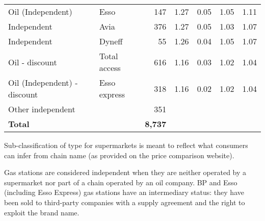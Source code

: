 \documentclass[english]{article}
\begin{document}
\begin{table}[H]
\begin{threeparttable}
\begin{tabular}{llrrrrr}
    Oil (Independent) & Esso  & 147   & 1.27  & 0.05  & 1.05  & 1.11 \\
    Independent & Avia  & 376   & 1.27  & 0.05  & 1.03  & 1.07 \\
    Independent & Dyneff & 55    & 1.26  & 0.04  & 1.05  & 1.07 \\
    Oil - discount & Total access & 616   & 1.16  & 0.03  & 1.02  & 1.04 \\
    Oil (Independent) - discount & Esso express & 318   & 1.16  & 0.02  & 1.02  & 1.04 \\
    Other independent &       & 351   &       &       &       &  \\
		\hline
    \textbf{Total} &       & \textbf{8,737} &       &       &       &  \\
    \hline
		\hline
\end{tabular}
\begin{tablenotes}
			\small
			\item Sub-classification of type for supermarkets is meant to reflect what consumers can infer from chain name (as provided on the price comparison website).
      \item Gas stations are considered independent when they are neither operated by a supermarket nor part of a chain operated by an oil company. BP and Esso (including Esso Express) gas stations  have an intermediary status: they have been sold to third-party companies with a supply agreement and the right to exploit the brand name.
      \item 
\end{tablenotes}
\end{threeparttable}
\end{table}

\newpage
\end{document}
